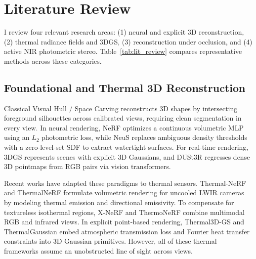 \documentclass[12pt,letterpaper]{article}
\begin{document}
\section{Literature Review}
\label{sec:literature_review}

I review four relevant research areas: (1) neural and explicit 3D reconstruction, (2) thermal radiance fields and 3DGS, (3) reconstruction under occlusion, and (4) active NIR photometric stereo. Table~\ref{tab:lit_review} compares representative methods across these categories.

\subsection{Foundational and Thermal 3D Reconstruction}
Classical Visual Hull / Space Carving reconstructs 3D shapes by intersecting foreground silhouettes across calibrated views, requiring clean segmentation in every view. In neural rendering, NeRF \cite{mildenhall2020nerf} optimizes a continuous volumetric MLP using an $L_2$ photometric loss, while NeuS \cite{wang2021neus} replaces ambiguous density thresholds with a zero-level-set SDF to extract watertight surfaces. For real-time rendering, 3DGS \cite{kerbl2023gaussians} represents scenes with explicit 3D Gaussians, and DUSt3R \cite{wang2024dust3r} regresses dense 3D pointmaps from RGB pairs via vision transformers.

Recent works have adapted these paradigms to thermal sensors. Thermal-NeRF \cite{ye2024thermalnerf} and ThermalNeRF \cite{lin2024thermalnerf} formulate volumetric rendering for uncooled LWIR cameras by modeling thermal emission and directional emissivity. To compensate for textureless isothermal regions, X-NeRF \cite{zhu2023xnerf} and ThermoNeRF \cite{hassan2025thermonerf} combine multimodal RGB and infrared views. In explicit point-based rendering, Thermal3D-GS \cite{chen2024thermal3dgs} and ThermalGaussian \cite{lu2024thermalgaussian} embed atmospheric transmission loss and Fourier heat transfer constraints into 3D Gaussian primitives. However, all of these thermal frameworks assume an unobstructed line of sight across views.
\end{document}

